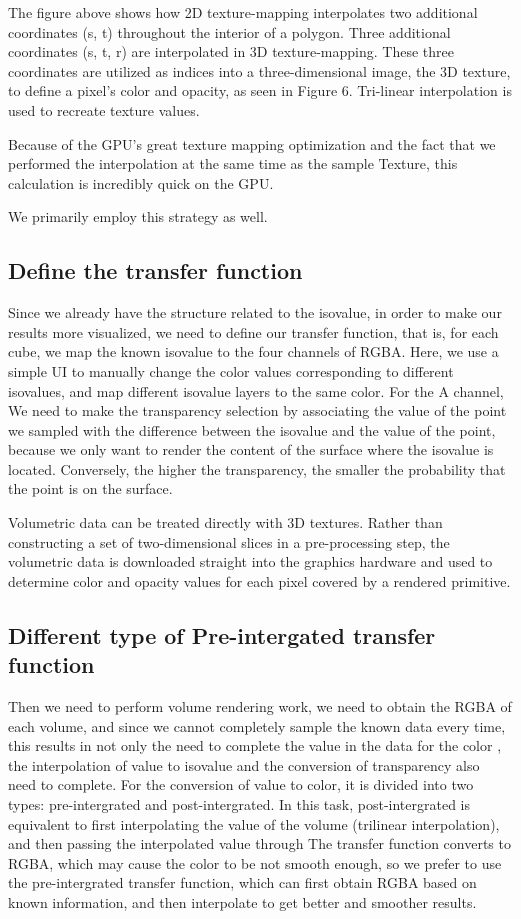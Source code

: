\documentclass[sigconf]{acmart}
\begin{document}
The figure above shows how 2D texture-mapping interpolates two additional coordinates (s, t) throughout the interior of a polygon. Three additional coordinates (s, t, r) are interpolated in 3D texture-mapping. These three coordinates are utilized as indices into a three-dimensional image, the 3D texture, to define a pixel's color and opacity, as seen in Figure 6. Tri-linear interpolation is used to recreate texture values.

Because of the GPU's great texture mapping optimization and the fact that we performed the interpolation at the same time as the sample Texture, this calculation is incredibly quick on the GPU.

We primarily employ this strategy as well.

\subsection{Define the transfer function}
Since we already have the structure related to the isovalue, in order to make our results more visualized, we need to define our transfer function, that is, for each cube, we map the known isovalue to the four channels of RGBA. Here, we use a simple UI to manually change the color values corresponding to different isovalues, and map different isovalue layers to the same color. For the A channel, We need to make the transparency selection by associating the value of the point we sampled with the difference between the isovalue and the value of the point, because we only want to render the content of the surface where the isovalue is located. Conversely, the higher the transparency, the smaller the probability that the point is on the surface.

Volumetric data can be treated directly with 3D textures. Rather than constructing a set of two-dimensional slices in a pre-processing step, the volumetric data is downloaded straight into the graphics hardware and used to determine color and opacity values for each pixel covered by a rendered primitive.


\subsection{Different type of Pre-intergated transfer function}
Then we need to perform volume rendering work, we need to obtain the RGBA of each volume, and since we cannot completely sample the known data every time, this results in not only the need to complete the value in the data for the color , the interpolation of value to isovalue and the conversion of transparency also need to complete. For the conversion of value to color, it is divided into two types: pre-intergrated and post-intergrated. In this task, post-intergrated is equivalent to first interpolating the value of the volume (trilinear interpolation), and then passing the interpolated value through The transfer function converts to RGBA, which may cause the color to be not smooth enough, so we prefer to use the pre-intergrated transfer function, which can first obtain RGBA based on known information, and then interpolate to get better and smoother results.
\end{document}
